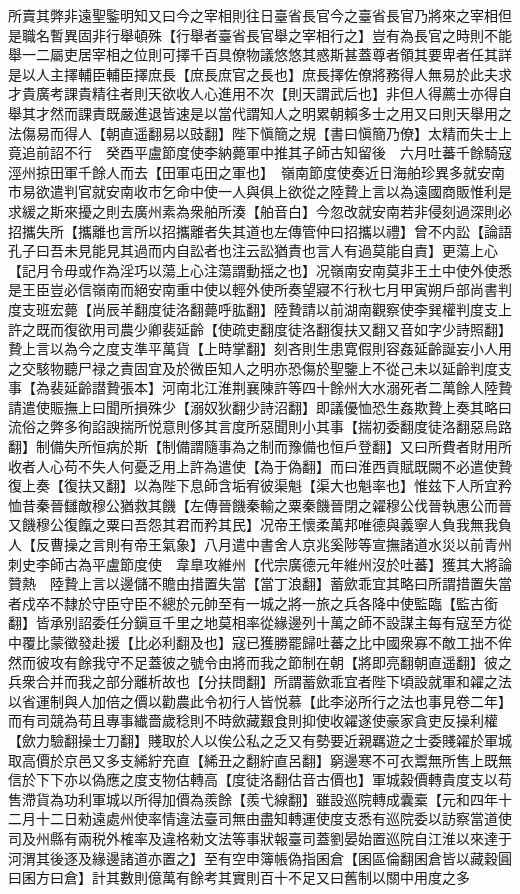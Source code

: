 所賣其弊非遠聖鍳明知又曰今之宰相則往日臺省長官今之臺省長官乃將來之宰相但是職名暫異固非行舉頓殊【行舉者臺省長官舉之宰相行之】豈有為長官之時則不能舉一二屬吏居宰相之位則可擇千百具僚物議悠悠其惑斯甚蓋尊者領其要卑者任其詳是以人主擇輔臣輔臣擇庶長【庶長庶官之長也】庶長擇佐僚將務得人無易於此夫求才貴廣考課貴精往者則天欲收人心進用不次【則天謂武后也】非但人得薦士亦得自舉其才然而課責既嚴進退皆速是以當代謂知人之明累朝賴多士之用又曰則天舉用之法傷易而得人【朝直遥翻易以豉翻】陛下愼簡之規【書曰愼簡乃僚】太精而失士上竟追前詔不行　癸酉平盧節度使李納薨軍中推其子師古知留後　六月吐蕃千餘騎寇涇州掠田軍千餘人而去【田軍屯田之軍也】　嶺南節度使奏近日海舶珍異多就安南市易欲遣判官就安南收市乞命中使一人與俱上欲從之陸贄上言以為遠國商販惟利是求緩之斯來擾之則去廣州素為衆舶所湊【舶音白】今忽改就安南若非侵刻過深則必招攜失所【攜離也言所以招攜離者失其道也左傳管仲曰招攜以禮】曾不内訟【論語孔子曰吾未見能見其過而内自訟者也注云訟猶責也言人有過莫能自責】更蕩上心【記月令毋或作為淫巧以蕩上心注蕩謂動揺之也】况嶺南安南莫非王土中使外使悉是王臣豈必信嶺南而絕安南重中使以輕外使所奏望寢不行秋七月甲寅朔戶部尚書判度支班宏薨【尚辰羊翻度徒洛翻薨呼肱翻】陸贄請以前湖南觀察使李巽權判度支上許之既而復欲用司農少卿裴延齡【使疏吏翻度徒洛翻復扶又翻又音如字少詩照翻】贄上言以為今之度支準平萬貨【上時掌翻】刻吝則生患寛假則容姦延齡誕妄小人用之交駭物聽尸禄之責固宜及於微臣知人之明亦恐傷於聖鑒上不從己未以延齡判度支事【為裴延齡譛贄張本】河南北江淮荆襄陳許等四十餘州大水溺死者二萬餘人陸贄請遣使賑撫上曰聞所損殊少【溺奴狄翻少詩沼翻】即議優恤恐生姦欺贄上奏其略曰流俗之弊多徇諂諛揣所悦意則侈其言度所惡聞則小其事【揣初委翻度徒洛翻惡烏路翻】制備失所恒病於斯【制備謂隨事為之制而豫備也恒戶登翻】又曰所費者財用所收者人心苟不失人何憂乏用上許為遣使【為于偽翻】而曰淮西貢賦既闕不必遣使贄復上奏【復扶又翻】以為陛下息師含垢宥彼渠魁【渠大也魁率也】惟兹下人所宜矜恤昔秦晉讎敵穆公猶救其饑【左傳晉饑秦輸之粟秦饑晉閉之糴穆公伐晉執惠公而晉又饑穆公復餼之粟曰吾怨其君而矜其民】况帝王懷柔萬邦唯德與義寧人負我無我負人【反曹操之言則有帝王氣象】八月遣中書舍人京兆奚陟等宣撫諸道水災以前青州刺史李師古為平盧節度使　韋臯攻維州【代宗廣德元年維州沒於吐蕃】獲其大將論贊熱　陸贄上言以邊儲不贍由措置失當【當丁浪翻】蓄歛乖宜其略曰所謂措置失當者戍卒不隸於守臣守臣不總於元帥至有一城之將一旅之兵各降中使監臨【監古銜翻】皆承别詔委任分鎭亘千里之地莫相率從緣邊列十萬之師不設謀主每有寇至方從中覆比蒙徵發赴援【比必利翻及也】寇已獲勝罷歸吐蕃之比中國衆寡不敵工拙不侔然而彼攻有餘我守不足蓋彼之號令由將而我之節制在朝【將即亮翻朝直遥翻】彼之兵衆合并而我之部分離析故也【分扶問翻】所謂蓄歛乖宜者陛下頃設就軍和糴之法以省運制與人加倍之價以勸農此令初行人皆悦慕【此李泌所行之法也事見卷二年】而有司競為苟且專事纎嗇歲稔則不時歛藏艱食則抑使收糴遂使豪家貪吏反操利權【歛力驗翻操士刀翻】賤取於人以俟公私之乏又有勢要近親羈遊之士委賤糴於軍城取高價於京邑又多支絺紵充直【絺丑之翻紵直呂翻】窮邊寒不可衣鬻無所售上既無信於下下亦以偽應之度支物估轉高【度徒洛翻估音古價也】軍城穀價轉貴度支以苟售滯貨為功利軍城以所得加價為羨餘【羨弋線翻】雖設巡院轉成囊槖【元和四年十二月十二日勑遠處州使率情違法臺司無由盡知轉運使度支悉有巡院委以訪察當道使司及州縣有兩税外榷率及違格勑文法等事狀報臺司蓋劉晏始置巡院自江淮以來達于河渭其後逐及緣邊諸道亦置之】至有空申簿帳偽指囷倉【囷區倫翻囷倉皆以藏穀圓曰囷方曰倉】計其數則億萬有餘考其實則百十不足又曰舊制以關中用度之多